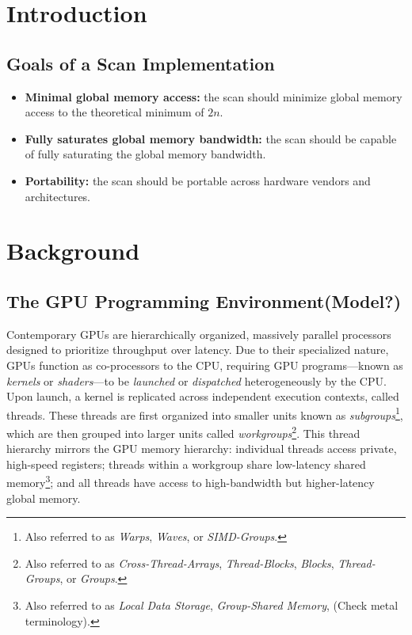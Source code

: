\documentclass[sigconf]{acmart}
\begin{document}
\section{Introduction}

\subsection{Goals of a Scan Implementation}
\begin{itemize}
  \item \textbf{Minimal global memory access:} the scan should minimize global memory access to the theoretical minimum of $2n$.
  \item \textbf{Fully saturates global memory bandwidth:} the scan should be capable of fully saturating the global memory bandwidth.
  \item \textbf{Portability:} the scan should be portable across hardware vendors and architectures. 
\end{itemize}

\section{Background}
\subsection{The GPU Programming Environment(Model?)}
Contemporary GPUs are hierarchically organized, massively parallel processors designed to prioritize throughput over latency. Due to their specialized nature, GPUs function as co-processors to the CPU, requiring GPU programs—known as \emph{kernels} or \emph{shaders}—to be \emph{launched} or \emph{dispatched} heterogeneously by the CPU. Upon launch, a kernel is replicated across independent execution contexts, called threads. These threads are first organized into smaller units known as \emph{subgroups}\footnote{Also referred to as \emph{Warps}, \emph{Waves}, or \emph{SIMD-Groups}.}, which are then grouped into larger units called \emph{workgroups}\footnote{Also referred to as \emph{Cross-Thread-Arrays}, \emph{Thread-Blocks}, \emph{Blocks}, \emph{Thread-Groups}, or \emph{Groups}.}. This thread hierarchy mirrors the GPU memory hierarchy: individual threads access private, high-speed registers; threads within a workgroup share low-latency shared memory\footnote{Also referred to as \emph{Local Data Storage}, \emph{Group-Shared Memory}, (Check metal terminology).}; and all threads have access to high-bandwidth but higher-latency global memory.
\end{document}
